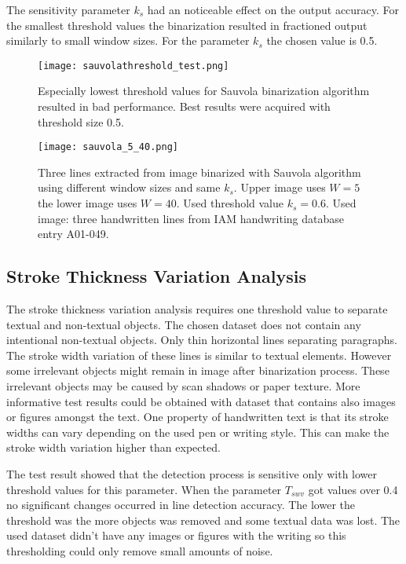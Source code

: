 \documentclass{article}
\begin{document}
    The sensitivity parameter $k_s$ had an noticeable effect on the output accuracy. For the smallest threshold values the binarization resulted in fractioned output similarly to small window sizes. For the parameter $k_s$ the chosen value is 0.5.

    \begin{figure}[!ht]
      \centering
      \texttt{[image: sauvolathreshold\_test.png]}
      \caption{Especially lowest threshold values for Sauvola binarization algorithm resulted in bad performance. Best results were acquired with threshold size 0.5. \label{fig:sauvolathreshold}}
    \end{figure}

    \begin{figure}[!ht]
      \centering
      \texttt{[image: sauvola\_5\_40.png]}
      \caption{Three lines extracted from image binarized with Sauvola algorithm using different window sizes and same $k_s$. Upper image uses $W = 5$  the lower image uses $W = 40$. Used threshold value $k_s = 0.6$. Used image: three handwritten lines from IAM handwriting database entry A01-049. \label{fig:sauvola540}}
    \end{figure}


    \subsection{Stroke Thickness Variation Analysis}
      The stroke thickness variation analysis requires one threshold value to separate textual and non-textual objects. The chosen dataset does not contain any intentional non-textual objects. Only thin horizontal lines separating paragraphs. The stroke width variation of these lines is similar to textual elements. However some irrelevant objects might remain in image after binarization process. These irrelevant objects may be caused by scan shadows or paper texture. More informative test results could be obtained with dataset that contains also images or figures amongst the text. One property of handwritten text is that its stroke widths can vary depending on the used pen or writing style. This can make the stroke width variation higher than expected.

      The test result showed that the detection process is sensitive only with lower threshold values for this parameter. When the parameter $T_{swv}$ got values over 0.4 no significant changes occurred in line detection accuracy. The lower the threshold was the more objects was removed and some textual data was lost. The used dataset didn't have any images or figures with the writing so this thresholding could only remove small amounts of noise.
\end{document}
